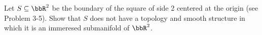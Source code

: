 Let $S\subseteq \bbR^2$ be the boundary of the square of side 2 centered at the origin (see Problem 3-5).  Show that $S$ does not have a topology and smooth structure in which it is an immeresed submanifold of $\bbR^2$.